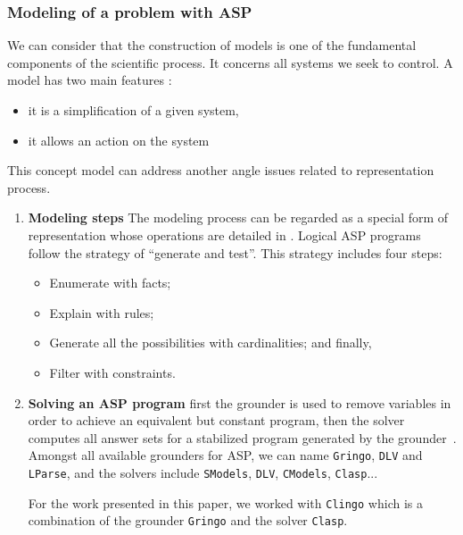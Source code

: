 \subsubsection{Modeling of a problem with ASP}

We can consider that the construction of models is one of the fundamental components of the scientific process. It concerns all systems we seek to control. A model has two main features \cite{Glimpse}:
\begin{itemize}
\item it is a simplification of a given system,
\item it allows an action on the system 
\end{itemize}
This concept model can address another angle issues related to representation process.

\begin{enumerate}
\item\textbf{Modeling steps}
The modeling process can be regarded as a special form of representation whose operations are detailed in \cite{baral2003knowledge}.
Logical ASP programs follow the strategy of “generate and test”.
This strategy includes four steps:
\begin{itemize}
\item Enumerate with facts;
\item Explain with rules;
\item Generate all the possibilities with cardinalities; and finally,
\item Filter with constraints.
\end{itemize}

\item \textbf{Solving an ASP program}
%
first the grounder is used to remove variables in order to achieve an equivalent but constant program,
then the solver computes all answer sets for a stabilized program generated by the grounder~\cite{Vladimir,AnsPrologAPE}.
Amongst all available grounders for ASP, we can name
\texttt{Gringo}, \texttt{DLV} and \texttt{LParse},
and the solvers include
\texttt{SModels}, \texttt{DLV}, \texttt{CModels}, \texttt{Clasp}...

For the work presented in this paper, we worked with \texttt{Clingo} which is a combination of the grounder \texttt{Gringo} and the solver \texttt{Clasp}.

\end{enumerate}

